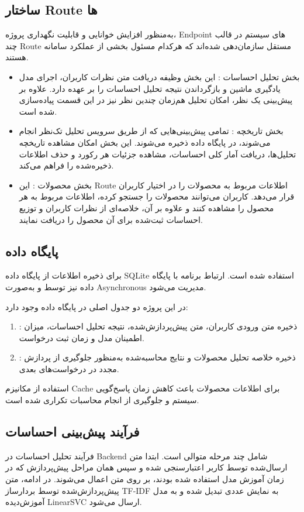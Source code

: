 \subsection{ساختار Route ها}
به‌منظور افزایش خوانایی و قابلیت نگهداری پروژه، Endpoint های سیستم در قالب چند Route مستقل سازمان‌دهی شده‌اند که هرکدام مسئول بخشی از عملکرد سامانه هستند.
\begin{itemize}
	\item بخش تحلیل احساسات :
	این بخش وظیفه دریافت متن نظرات کاربران، اجرای مدل یادگیری ماشین و بازگرداندن نتیجه تحلیل احساسات را بر عهده دارد. علاوه بر پیش‌بینی یک نظر، امکان تحلیل هم‌زمان چندین نظر نیز در این قسمت پیاده‌سازی شده است.
	\item بخش تاریخچه :
	تمامی پیش‌بینی‌هایی که از طریق سرویس تحلیل تک‌نظر انجام می‌شوند، در پایگاه داده ذخیره می‌شوند. این بخش امکان مشاهده تاریخچه تحلیل‌ها، دریافت آمار کلی احساسات، مشاهده جزئیات هر رکورد و حذف اطلاعات ذخیره‌شده را فراهم می‌کند.
	\item بخش محصولات :
	این Route اطلاعات مربوط به محصولات را در اختیار کاربران قرار می‌دهد. کاربران می‌توانند محصولات را جستجو کرده، اطلاعات مربوط به هر محصول را مشاهده کنند و علاوه بر آن، خلاصه‌ای از نظرات کاربران و توزیع احساسات ثبت‌شده برای آن محصول را دریافت نمایند.
\end{itemize}
\subsection{پایگاه داده}
برای ذخیره اطلاعات از پایگاه داده SQLite استفاده شده است. ارتباط برنامه با پایگاه داده نیز توسط  و به‌صورت Asynchronous مدیریت می‌شود.

در این پروژه دو جدول اصلی در پایگاه داده وجود دارد:
\begin{enumerate}
	\item {}:
	 ذخیره متن ورودی کاربران، متن پیش‌پردازش‌شده، نتیجه تحلیل احساسات، میزان اطمینان مدل و زمان ثبت درخواست.
	 \item {}:
	 ذخیره خلاصه تحلیل محصولات و نتایج محاسبه‌شده به‌منظور جلوگیری از پردازش مجدد در درخواست‌های بعدی.
\end{enumerate}
استفاده از مکانیزم Cache برای اطلاعات محصولات باعث کاهش زمان پاسخ‌گویی سیستم و جلوگیری از انجام محاسبات تکراری شده است.
\subsection{فرآیند پیش‌بینی احساسات }
فرآیند تحلیل احساسات در Backend شامل چند مرحله متوالی است. ابتدا متن ارسال‌شده توسط کاربر اعتبارسنجی شده و سپس همان مراحل پیش‌پردازش که در زمان آموزش مدل استفاده شده بودند، بر روی متن اعمال می‌شوند. در ادامه، متن پیش‌پردازش‌شده توسط بردارساز TF-IDF به نمایش عددی تبدیل شده و به مدل آموزش‌دیده LinearSVC ارسال می‌شود.

